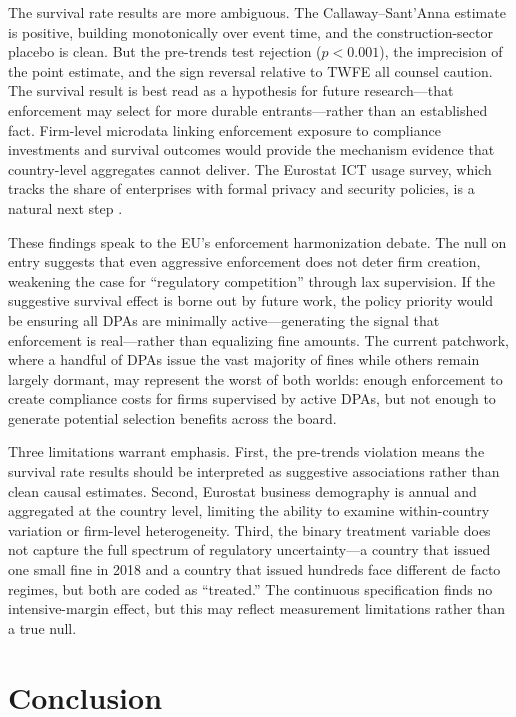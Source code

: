 \documentclass[12pt]{article}
\begin{document}
The survival rate results are more ambiguous. The Callaway--Sant'Anna estimate is positive, building monotonically over event time, and the construction-sector placebo is clean. But the pre-trends test rejection ($p < 0.001$), the imprecision of the point estimate, and the sign reversal relative to TWFE all counsel caution. The survival result is best read as a hypothesis for future research---that enforcement may select for more durable entrants---rather than an established fact. Firm-level microdata linking enforcement exposure to compliance investments and survival outcomes would provide the mechanism evidence that country-level aggregates cannot deliver. The Eurostat ICT usage survey, which tracks the share of enterprises with formal privacy and security policies, is a natural next step \citep{godinho2023}.

These findings speak to the EU's enforcement harmonization debate. The null on entry suggests that even aggressive enforcement does not deter firm creation, weakening the case for ``regulatory competition'' through lax supervision. If the suggestive survival effect is borne out by future work, the policy priority would be ensuring all DPAs are minimally active---generating the signal that enforcement is real---rather than equalizing fine amounts. The current patchwork, where a handful of DPAs issue the vast majority of fines while others remain largely dormant, may represent the worst of both worlds: enough enforcement to create compliance costs for firms supervised by active DPAs, but not enough to generate potential selection benefits across the board.

Three limitations warrant emphasis. First, the pre-trends violation means the survival rate results should be interpreted as suggestive associations rather than clean causal estimates. Second, Eurostat business demography is annual and aggregated at the country level, limiting the ability to examine within-country variation or firm-level heterogeneity. Third, the binary treatment variable does not capture the full spectrum of regulatory uncertainty---a country that issued one small fine in 2018 and a country that issued hundreds face different de facto regimes, but both are coded as ``treated.'' The continuous specification finds no intensive-margin effect, but this may reflect measurement limitations rather than a true null.

\section{Conclusion}
\end{document}
